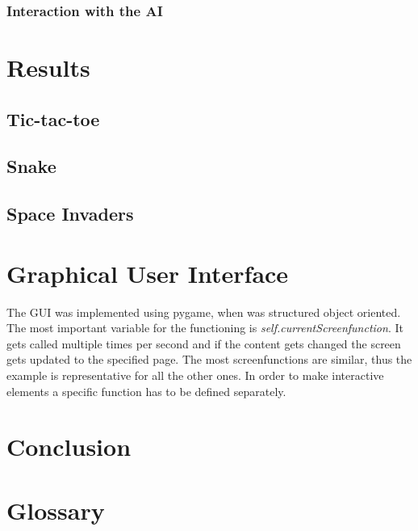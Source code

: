 \documentclass[12pt]{article}
\begin{document}
\subsubsection{Interaction with the AI}
\section{Results}
\subsection{Tic-tac-toe}
\subsection{Snake}
\subsection{Space Invaders}
\section{Graphical User Interface}
The GUI was implemented using pygame, when was structured object oriented. The most important variable for the functioning is \textit{self.currentScreenfunction}. It gets called multiple times per second and if the content gets changed the screen gets updated to the specified page. The most screenfunctions are similar, thus the example is representative for all the other ones. In order to make interactive elements a specific function has to be defined separately.
\section{Conclusion}
\section{Glossary}


\newpage

\listoffigures
\end{document}
